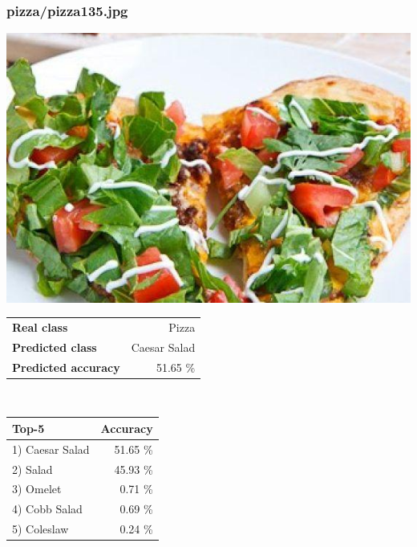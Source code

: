 \subsubsection{pizza/pizza135.jpg}

\begin{minipage}[t]{0.4\textwidth}
	\vspace{0pt}
	\includegraphics[width=\linewidth]{images/evaluation-images/pizza/pizza135.jpg}
\end{minipage}
\hfill
\begin{minipage}[t]{0.5\textwidth}
	\vspace{0pt}\raggedright
	\begin{tabularx}{\textwidth}{X r}
		\small \textbf{Real class} & \small Pizza\\
		\small \textbf{Predicted class} & \small Caesar Salad\\
		\small \textbf{Predicted accuracy} & \small 51.65 \%
    \end{tabularx}\\
    
    \vspace{6pt}
	\begin{tabularx}{\textwidth}{X r}
        \small \textbf{Top-5} & \small \textbf{Accuracy} \\
        \hline
		\small 1) Caesar Salad & \small 51.65 \%\\\small 2) Salad & \small 45.93 \%\\\small 3) Omelet & \small 0.71 \%\\\small 4) Cobb Salad & \small 0.69 \%\\\small 5) Coleslaw & \small 0.24 \%
    \end{tabularx}
\end{minipage}
    
